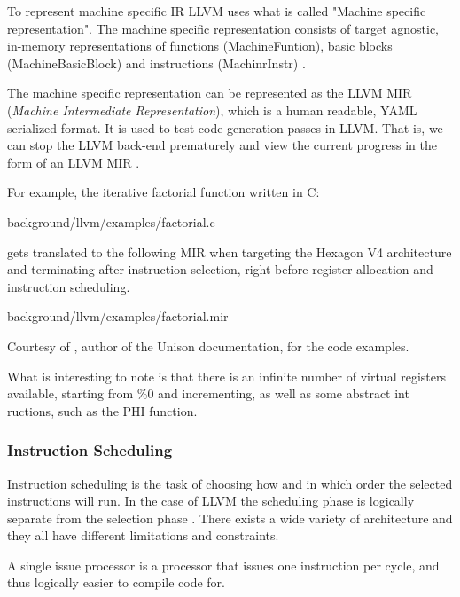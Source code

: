 To represent machine specific IR LLVM uses what is called "Machine specific representation".
The machine specific representation consists of target agnostic, in-memory representations
of functions (MachineFuntion), basic blocks (MachineBasicBlock) and instructions
(MachinrInstr) \cite{llvm-mir-lang-ref, llvm-codegenerator-machinecode}.

The machine specific representation can be represented as the LLVM MIR (\textit{Machine
Intermediate Representation}), which is a human readable, YAML serialized format. It is
used to test code generation passes in LLVM. That is, we can stop the LLVM back-end
prematurely and view the current progress in the form of an LLVM MIR
\cite{llvm-mir-lang-ref}.

For example, the iterative factorial function written in C:


{background/llvm/examples/factorial.c}

gets translated to the following MIR when targeting the Hexagon V4 architecture and
terminating after instruction selection, right before register allocation and instruction
scheduling.


{background/llvm/examples/factorial.mir}

Courtesy of \textcite{unison-docs-examples}, author of the Unison documentation, for the code examples.

What is interesting to note is that there is an infinite number of virtual registers available,
starting from \%0 and incrementing, as well as some abstract int ructions, such as the PHI
function.

\subsubsection{Instruction Scheduling}
Instruction scheduling is the task of choosing how and in which order the selected instructions
will run. In the case of LLVM the scheduling phase is logically separate from the selection
phase \cite{llvm-codegenerator-scheduling}. There exists a wide variety of architecture
and they all have different limitations and constraints.

A single issue processor is a processor that issues one instruction per cycle, and thus
logically easier to compile code for.

